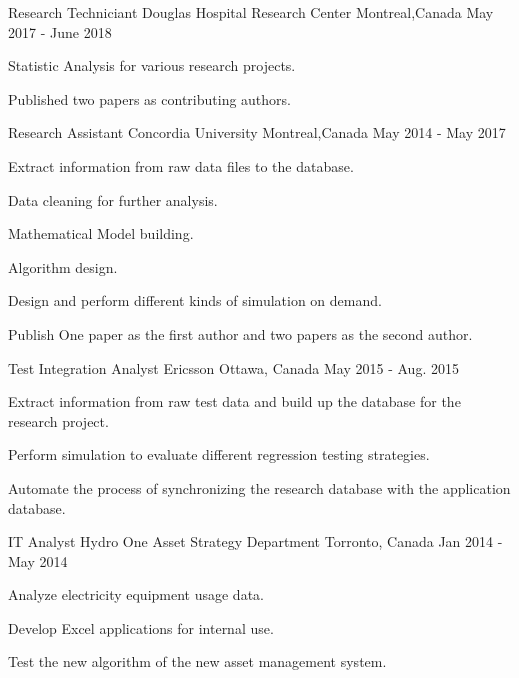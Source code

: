 \documentclass[11pt, a4paper]{awesome-cv} %
\begin{document}
\begin{cventries}
	\cventry
	{Research Techniciant} %
	{Douglas Hospital Research Center} %
	{Montreal,Canada} %
	{May 2017 - June 2018} %
	{ %
		\begin{cvitems}
			\item {Statistic Analysis for various research projects.}
			\item {Published two papers as contributing authors.}
		\end{cvitems}
	}
	
	\cventry
	{Research Assistant} %
	{Concordia University} %
	{Montreal,Canada} %
	{May 2014 - May 2017} %
	{ %
		\begin{cvitems}
			\item {Extract information from raw data files to the database.}
			\item {Data cleaning for further analysis.}
			\item {Mathematical Model building.}
			\item {Algorithm design.}
			\item {Design and perform different kinds of simulation on demand.}
			\item {Publish One paper as the first author and two papers as the second author.}
		\end{cvitems}
	}
	
	
	\cventry
	{Test Integration Analyst} %
	{Ericsson} %
	{Ottawa, Canada} %
	{May 2015 - Aug. 2015} %
	{ %
		\begin{cvitems}
			\item {Extract information from raw test data and build up the database for the research project.}
			\item {Perform simulation to evaluate different regression testing strategies.}
			\item {Automate the process of synchronizing the research database with the application database.}
		\end{cvitems}
	}
	
	
	
	\cventry
	{IT Analyst} %
	{Hydro One Asset Strategy Department} %
	{Torronto, Canada} %
	{Jan 2014 - May 2014} %
	{ %
		\begin{cvitems}
			\item {Analyze electricity equipment usage data.}
			\item {Develop Excel applications for internal use.}
			\item {Test the new algorithm of the new asset management system.}
		\end{cvitems}
	}
	

\end{cventries}
\end{document}

